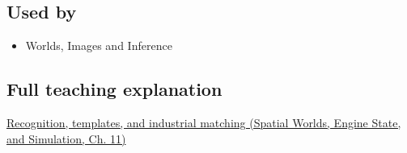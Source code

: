 \subsection{Used by}\label{appendix-5fb4af80d1c7-used-by}

\begin{itemize}
\tightlist
\item
  {Worlds, Images and Inference}
\end{itemize}

\subsection{Full teaching explanation}\label{appendix-5fb4af80d1c7-full-teaching-explanation}

\href{../05-Spatial-Worlds-Engine-State-and-Simulation/main.pdf\#nameddest=04-visual-computing-ii-ch030-recognition-templates-and-industrial-matching}{Recognition, templates, and industrial matching (Spatial Worlds, Engine State, and Simulation, Ch. 11)}
